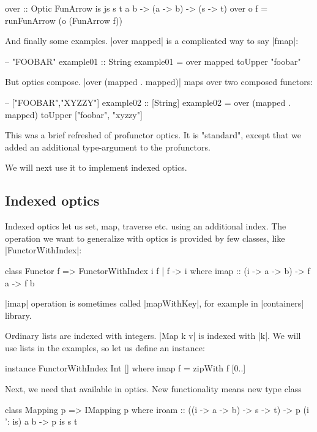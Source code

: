 \begin{code}
over :: Optic FunArrow is js s t a b
     -> (a -> b)
     -> (s -> t)
over o f = runFunArrow (o (FunArrow f))
\end{code}

And finally some examples. |over mapped| is a complicated way to say |fmap|:

\begin{code}
-- "FOOBAR"
example01 :: String
example01 = over mapped toUpper "foobar"
\end{code}

But optics compose. |over (mapped . mapped)| maps over two composed functors:

\begin{code}
-- ["FOOBAR","XYZZY"]
example02 :: [String]
example02 = over (mapped . mapped) toUpper ["foobar", "xyzzy"]
\end{code}

This was a brief refreshed of profunctor optics.
It is "standard", except that we added an additional
type-argument to the profunctors.

We will next use it to implement indexed optics.

\subsection{Indexed optics}

Indexed optics let us set, map, traverse etc. using an additional index.
The operation we want to generalize with optics is provided
by few classes, like |FunctorWithIndex|:

\begin{code}
class Functor f => FunctorWithIndex i f | f -> i where
    imap :: (i -> a -> b) -> f a -> f b
\end{code}

|imap| operation is sometimes called |mapWithKey|, for example
in |containers| library.

Ordinary lists are indexed with integers. |Map k v| is indexed with |k|.
We will use lists in the examples, so let us define an instance:

\begin{code}
instance FunctorWithIndex Int [] where
    imap f = zipWith f [0..]
\end{code}

Next, we need that available in optics.
New functionality means new type class

\begin{code}
class Mapping p => IMapping p where
    iroam :: ((i -> a -> b) -> s -> t) -> p (i ': is) a b -> p is s t
\end{code}

